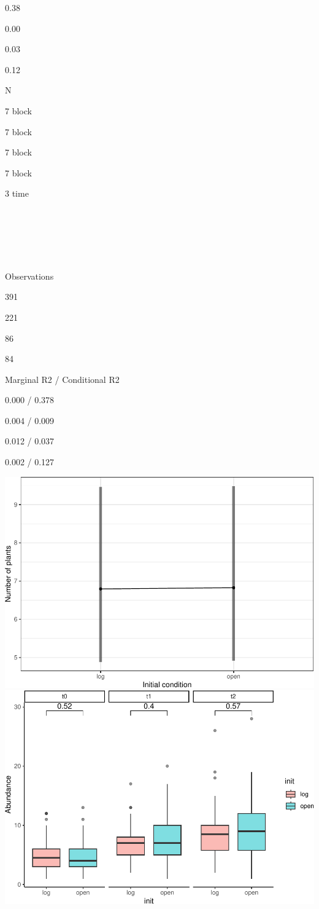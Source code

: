 \documentclass[
]{article}
\begin{document}
0.38

0.00

0.03

0.12

N

7 block

7 block

7 block

7 block

3 time

~

~

~

Observations

391

221

86

84

Marginal R2 / Conditional R2

0.000 / 0.378

0.004 / 0.009

0.012 / 0.037

0.002 / 0.127

\includegraphics{log-project-aubrie-winnie_files/figure-latex/unnamed-chunk-1-1.pdf}
\includegraphics{log-project-aubrie-winnie_files/figure-latex/unnamed-chunk-1-2.pdf}
\end{document}
